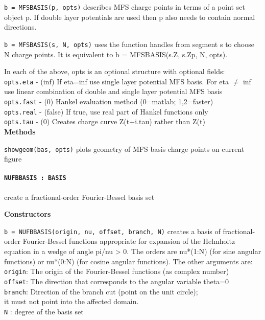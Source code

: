 {\tt b = MFSBASIS(p, opts)} describes MFS charge points in terms of a point
   set object p. If double layer potentials are used then p also needs to
   contain normal directions.

{\tt b = MFSBASIS(s, N, opts)} uses the function handles from segment s to choose
   N charge points. It is equivalent to b = MFSBASIS({s.Z, s.Zp}, N, opts).

  In each of the above, opts is an optional structure with optional fields:\\
  {\tt opts.eta}   - (inf) If eta=inf use single layer potential MFS basis. For
               eta $\neq$ inf use linear combination of double and single layer
               potential MFS basis\\
  {\tt opts.fast}  - (0) Hankel evaluation method (0=matlab; 1,2=faster)\\
  {\tt opts.real}  - (false) If true, use real part of Hankel functions only\\
  {\tt opts.tau}   - (0) Creates charge curve Z(t+i.tau) rather than Z(t)\\

\textbf{Methods}

{\tt showgeom(bas, opts)} plots geometry of MFS basis charge points on current figure


\newpage

\paragraph{\tt NUFBBASIS : BASIS} create a fractional-order Fourier-Bessel
basis set

\textbf{Constructors}


{\tt b = NUFBBASIS(origin, nu, offset, branch, N)} creates a basis of
fractional- 
   order Fourier-Bessel functions appropriate for expansion of the Helmholtz
   equation in a wedge of angle pi/nu > 0. The orders are nu*(1:N) (for sine
   angular functions) or nu*(0:N) (for cosine angular functions). The other
   arguments are:\\ 
     {\tt origin}: The origin of the Fourier-Bessel functions (as complex number)\\
     {\tt offset}: The direction that corresponds to the angular variable theta=0\\
     {\tt branch}: Direction of the branch cut (point on the unit circle);\\
             it must not point into the affected domain.\\
     {\tt N}     : degree of the basis set

